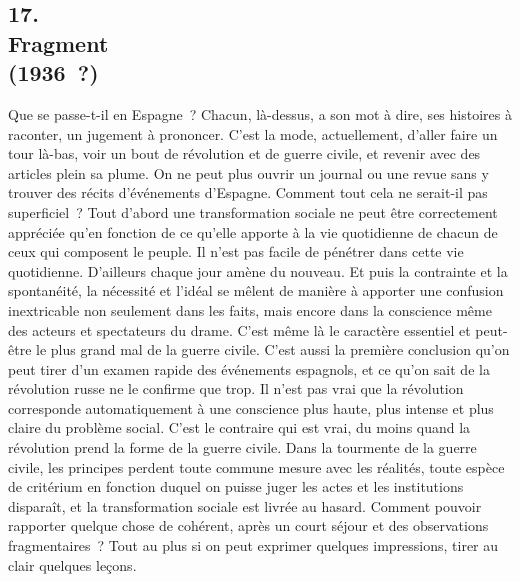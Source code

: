 \documentclass[french,twoside]{book} %
\begin{document}
\begin{center}
\end{center}
\subsection[17. Fragment, (1936 ?)]{17. \\
Fragment \\
(1936 ?)}
\noindent \par
Que se passe-t-il en Espagne ? Chacun, là-dessus, a son mot à dire, ses histoires à raconter, un jugement à prononcer. C'est la mode, actuellement, d'aller faire un tour là-bas, voir un bout de révolution et de guerre civile, et revenir avec des articles plein sa plume. On ne peut plus ouvrir un journal ou une revue sans y trouver des récits d'événements d'Espagne. Comment tout cela ne serait-il pas superficiel ? Tout d'abord une transformation sociale ne peut être correctement appréciée qu'en fonction de ce qu'elle apporte à la vie quotidienne de chacun de ceux qui composent le peuple. Il n'est pas facile de pénétrer dans cette vie quotidienne. D'ailleurs chaque jour amène du nouveau. Et puis la contrainte et la spontanéité, la nécessité et l'idéal se mêlent de manière à apporter une confusion inextricable non seulement dans les faits, mais encore dans la conscience même des acteurs et spectateurs du drame. C'est même là le caractère essentiel et peut-être le plus grand mal de la guerre civile. C'est aussi la première conclusion qu'on peut tirer d'un examen rapide des événements espagnols, et ce qu'on sait de la révolution russe ne le confirme que trop. Il n'est pas vrai que la révolution corresponde automati­quement à une conscience plus haute, plus intense et plus claire du problème social. C'est le contraire qui est vrai, du moins quand la révolution prend la forme de la guerre civile. Dans la tourmente de la guerre civile, les principes perdent toute commune mesure avec les réalités, toute espèce de critérium en fonction duquel on puisse juger les actes et les institutions disparaît, et la transformation sociale est livrée au hasard. Comment pouvoir rapporter quelque chose de cohérent, après un court séjour et des observations frag­mentaires ? Tout au plus si on peut exprimer quelques impressions, tirer au clair quelques leçons.\par

\begin{center}
\end{center}
\end{document}
